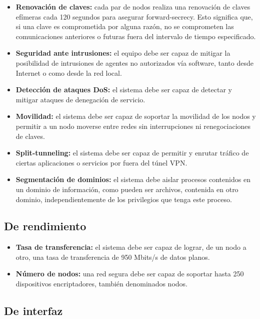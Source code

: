 \begin{itemize}
    \item \textbf{Renovación de claves:} cada par de nodos realiza una renovación de claves efímeras cada 120 segundos para asegurar forward-secrecy. Esto significa que, si una clave es comprometida por alguna razón, no se comprometen las comunicaciones anteriores o futuras fuera del intervalo de tiempo especificado.
    \item \textbf{Seguridad ante intrusiones:} el equipo debe ser capaz de  mitigar la posibilidad de intrusiones de agentes no autorizados vía software, tanto desde Internet o como desde la red local.
    \item \textbf{Detección de ataques DoS:} el sistema debe ser capaz de detectar y mitigar ataques de denegación de servicio.
    \item \textbf{Movilidad:} el sistema debe ser capaz de soportar la movilidad de los nodos y permitir a un nodo moverse entre redes sin interrupciones ni renegociaciones de claves. 
    \item \textbf{Split-tunneling:} el sistema debe ser capaz de permitir y enrutar tráfico de ciertas aplicaciones o servicios por fuera del túnel VPN. 
    \item \textbf{Segmentación de dominios: } el sistema debe aislar procesos contenidos en un dominio de información, como pueden ser archivos, contenida en otro dominio, independientemente de los privilegios que tenga este proceso.
\end{itemize}

\subsection{De rendimiento}

\begin{itemize}
    \item \textbf{Tasa de transferencia:} el sistema debe ser capaz de lograr, de un nodo a otro, una tasa de transferencia de 950 Mbits/s de datos planos.
    \item \textbf{Número de nodos:} una red segura debe ser capaz de soportar hasta 250 dispositivos encriptadores, también denominados nodos. 
\end{itemize}

\subsection{De interfaz}

